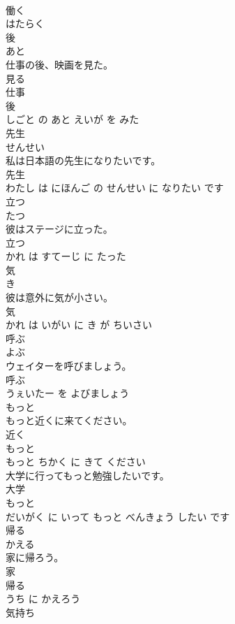 \documentclass[8pt]{extreport}
\begin{document}
\begin{CJK}{UTF8}{min}
\\	働く	
\\	はたらく			
\\	後	
\\	あと			
\\	仕事の後、映画を見た。	
\\	見る 
\\	仕事 
\\	後 
\\	しごと の あと えいが を みた			
\\	先生	
\\	せんせい			
\\	私は日本語の先生になりたいです。	
\\	先生 
\\	わたし は にほんご の せんせい に なりたい です			
\\	立つ	
\\	たつ			
\\	彼はステージに立った。	
\\	立つ 
\\	かれ は すてーじ に たった			
\\	気	
\\	き			
\\	彼は意外に気が小さい。	
\\	気 
\\	かれ は いがい に き が ちいさい			
\\	呼ぶ	
\\	よぶ			
\\	ウェイターを呼びましょう。	
\\	呼ぶ 
\\	うぇいたー を よびましょう			
\\	もっと	
\\	もっと近くに来てください。	
\\	近く 
\\	もっと 
\\	もっと ちかく に きて ください			
\\	大学に行ってもっと勉強したいです。	
\\	大学 
\\	もっと 
\\	だいがく に いって もっと べんきょう したい です			
\\	帰る	
\\	かえる			
\\	家に帰ろう。	
\\	家 
\\	帰る 
\\	うち に かえろう			
\\	気持ち	

\end{CJK}
\end{document}
